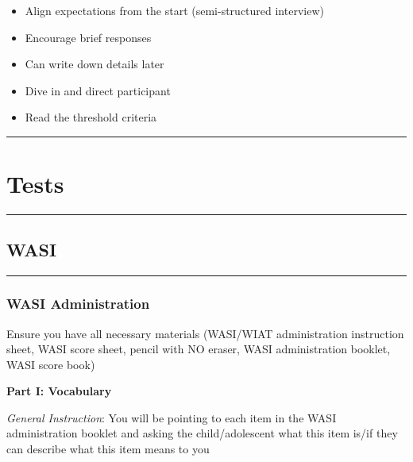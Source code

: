 \documentclass[]{book}
\providecommand{\tightlist}{%
  \setlength{\itemsep}{0pt}\setlength{\parskip}{0pt}}
\begin{document}
\begin{itemize}
\tightlist
\item
  Align expectations from the start (semi-structured interview)
\item
  Encourage brief responses
\item
  Can write down details later
\item
  Dive in and direct participant
\item
  Read the threshold criteria
\end{itemize}

\begin{center}\rule{0.5\linewidth}{\linethickness}\end{center}

\hypertarget{tests}{%
\section{Tests}\label{tests}}

\begin{center}\rule{0.5\linewidth}{\linethickness}\end{center}

\hypertarget{wasi}{%
\subsection{WASI}\label{wasi}}

\begin{center}\rule{0.5\linewidth}{\linethickness}\end{center}

\hypertarget{wasi-administration}{%
\subsubsection{WASI Administration}\label{wasi-administration}}

Ensure you have all necessary materials (WASI/WIAT administration instruction sheet, WASI score sheet, pencil with NO eraser, WASI administration booklet, WASI score book)

\textbf{Part I: Vocabulary}

\emph{General Instruction}: You will be pointing to each item in the WASI administration booklet and asking the child/adolescent what this item is/if they can describe what this item means to you
\end{document}
